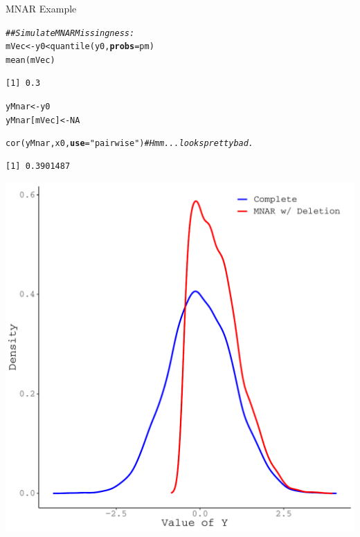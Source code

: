 \documentclass{beamer}\usepackage[]{graphicx}\usepackage[]{color}
\makeatletter
\newcommand{\hlnum}[1]{\textcolor[rgb]{0.69,0.494,0}{#1}}%
\newcommand{\hlstr}[1]{\textcolor[rgb]{0.749,0.012,0.012}{#1}}%
\newcommand{\hlcom}[1]{\textcolor[rgb]{0.514,0.506,0.514}{\textit{#1}}}%
\newcommand{\hlopt}[1]{\textcolor[rgb]{0,0,0}{#1}}%
\newcommand{\hlstd}[1]{\textcolor[rgb]{0,0,0}{#1}}%
\newcommand{\hlkwb}[1]{\textcolor[rgb]{0,0.341,0.682}{#1}}%
\newcommand{\hlkwc}[1]{\textcolor[rgb]{0,0,0}{\textbf{#1}}}%
\newcommand{\hlkwd}[1]{\textcolor[rgb]{0.004,0.004,0.506}{#1}}%
\newenvironment{kframe}{%
 \def\at@end@of@kframe{}%
 \ifinner\ifhmode%
  \def\at@end@of@kframe{\end{minipage}}%
  \begin{minipage}{\columnwidth}%
 \fi\fi%
 \def\FrameCommand##1{\hskip\@totalleftmargin \hskip-\fboxsep
 \colorbox{shadecolor}{##1}\hskip-\fboxsep
     \hskip-\linewidth \hskip-\@totalleftmargin \hskip\columnwidth}%
 \MakeFramed {\advance\hsize-\width
   \@totalleftmargin\z@ \linewidth\hsize
   \@setminipage}}%
 {\par\unskip\endMakeFramed%
 \at@end@of@kframe}
\newenvironment{knitrout}{}{} %
\makeatother
\begin{document}

\begin{frame}{MNAR Example}
  
\begin{knitrout}\footnotesize
{}\color{fgcolor}\begin{kframe}
\begin{alltt}
\hlcom{## Simulate MNAR Missingness:}
\hlstd{mVec} \hlkwb{<-} \hlstd{y0} \hlopt{<} \hlkwd{quantile}\hlstd{(y0,} \hlkwc{probs} \hlstd{= pm)}
\hlkwd{mean}\hlstd{(mVec)}
\end{alltt}
\begin{verbatim}
[1] 0.3
\end{verbatim}
\begin{alltt}
\hlstd{yMnar}       \hlkwb{<-} \hlstd{y0}
\hlstd{yMnar[mVec]} \hlkwb{<-} \hlnum{NA}

\hlkwd{cor}\hlstd{(yMnar, x0,} \hlkwc{use} \hlstd{=} \hlstr{"pairwise"}\hlstd{)} \hlcom{# Hmm...looks pretty bad.}
\end{alltt}
\begin{verbatim}
[1] 0.3901487
\end{verbatim}
\end{kframe}
\end{knitrout}

\pagebreak

\begin{knitrout}\footnotesize
{}\color{fgcolor}

{\centering \includegraphics[width=0.65\linewidth]{figure/intro-unnamed-chunk-16-1} 

}


\end{knitrout}

\end{frame}
\end{document}
